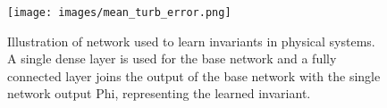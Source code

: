 \documentclass[10pt,letterpaper]{report}
\begin{document}
\begin{figure}
	\begin{center}
		\texttt{[image: images/mean\_turb\_error.png]}
		\caption{\small Illustration of network used to learn invariants in physical systems. A single dense layer is used for the base network and a fully connected layer joins the output of the base network with the single network output Phi, representing the learned invariant.}
		\label{mean_error}
	\end{center}	
\end{figure}
\end{document}
